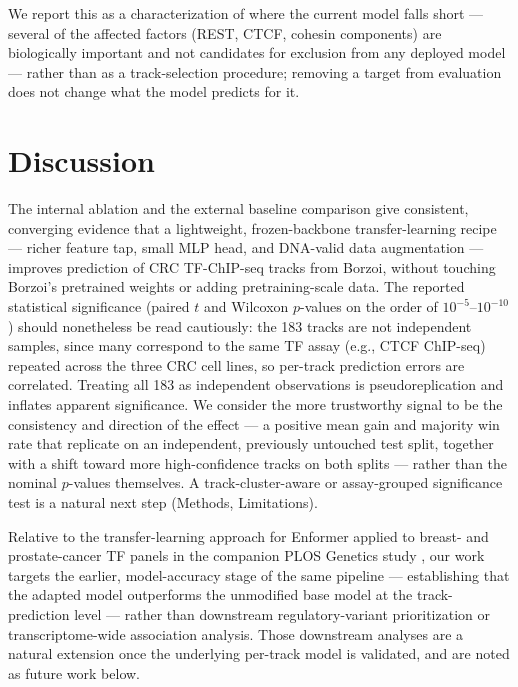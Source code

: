 \documentclass[10pt]{article}
\begin{document}
We report this as a characterization of where the current model falls short --- several of the affected factors (REST, CTCF, cohesin components) are biologically important and not candidates for exclusion from any deployed model --- rather than as a track-selection procedure; removing a target from evaluation does not change what the model predicts for it.

\section*{Discussion}
The internal ablation and the external baseline comparison give consistent, converging evidence that a lightweight, frozen-backbone transfer-learning recipe --- richer feature tap, small MLP head, and DNA-valid data augmentation --- improves prediction of CRC TF-ChIP-seq tracks from Borzoi, without touching Borzoi's pretrained weights or adding pretraining-scale data. The reported statistical significance (paired $t$ and Wilcoxon $p$-values on the order of $10^{-5}$--$10^{-10}$) should nonetheless be read cautiously: the 183 tracks are not independent samples, since many correspond to the same TF assay (e.g., CTCF ChIP-seq) repeated across the three CRC cell lines, so per-track prediction errors are correlated. Treating all 183 as independent observations is pseudoreplication and inflates apparent significance. We consider the more trustworthy signal to be the consistency and direction of the effect --- a positive mean gain and majority win rate that replicate on an independent, previously untouched test split, together with a shift toward more high-confidence tracks on both splits --- rather than the nominal $p$-values themselves. A track-cluster-aware or assay-grouped significance test is a natural next step (Methods, Limitations).

Relative to the transfer-learning approach for Enformer applied to breast- and prostate-cancer TF panels in the companion PLOS Genetics study \citep{plosgenetics2026}, our work targets the earlier, model-accuracy stage of the same pipeline --- establishing that the adapted model outperforms the unmodified base model at the track-prediction level --- rather than downstream regulatory-variant prioritization or transcriptome-wide association analysis. Those downstream analyses are a natural extension once the underlying per-track model is validated, and are noted as future work below.
\end{document}

